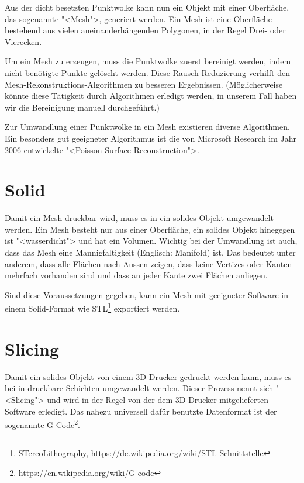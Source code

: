 Aus der dicht besetzten Punktwolke kann nun ein Objekt mit einer Oberfläche, das
sogenannte "<Mesh">, generiert werden. Ein Mesh ist eine Oberfläche bestehend
aus vielen aneinanderhängenden Polygonen, in der Regel Drei- oder Vierecken.

Um ein Mesh zu erzeugen, muss die Punktwolke zuerst bereinigt werden, indem
nicht benötigte Punkte gelöscht werden. Diese Rausch-Reduzierung verhilft den
Mesh-Rekonstruktions-Algorithmen zu besseren Ergebnissen. (Möglicherweise könnte
diese Tätigkeit durch Algorithmen erledigt werden, in unserem Fall haben wir die
Bereinigung manuell durchgeführt.)

Zur Umwandlung einer Punktwolke in ein Mesh existieren diverse Algorithmen. Ein
besonders gut geeigneter Algorithmus ist die von Microsoft Research im Jahr
2006 entwickelte "<Poisson Surface Reconstruction">\cite{kazhdan:2006}.


\section{Solid}

Damit ein Mesh druckbar wird, muss es in ein solides Objekt umgewandelt werden.
Ein Mesh besteht nur aus einer Oberfläche, ein solides Objekt hinegegen ist
"<wasserdicht"> und hat ein Volumen. Wichtig bei der Umwandlung ist auch, dass
das Mesh eine Mannigfaltigkeit (Englisch: Manifold) ist. Das bedeutet unter
anderem, dass alle Flächen nach Aussen zeigen, dass keine Vertizes oder Kanten
mehrfach vorhanden sind und dass an jeder Kante zwei Flächen anliegen.

Sind diese Voraussetzungen gegeben, kann ein Mesh mit geeigneter Software in
einem Solid-Format wie STL\footnote{STereoLithography,
	\url{https://de.wikipedia.org/wiki/STL-Schnittstelle}} exportiert werden.


\section{Slicing}

Damit ein solides Objekt von einem 3D-Drucker gedruckt werden kann, muss es bei
in druckbare Schichten umgewandelt werden. Dieser Prozess nennt sich "<Slicing">
und wird in der Regel von der dem 3D-Drucker mitgelieferten Software erledigt.
%
%
Das nahezu universell dafür benutzte Datenformat ist der sogenannte
G-Code\footnote{\url{https://en.wikipedia.org/wiki/G-code}}.

